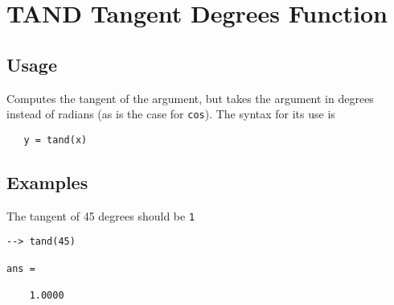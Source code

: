 \section{TAND Tangent Degrees Function}

\subsection{Usage}

Computes the tangent of the argument, but takes
the argument in degrees instead of radians (as is the case
for \verb|cos|). The syntax for its use is
\begin{verbatim}
   y = tand(x)
\end{verbatim}
\subsection{Examples}

The tangent of 45 degrees should be \verb|1|
\begin{verbatim}
--> tand(45)

ans = 

    1.0000 
\end{verbatim}
